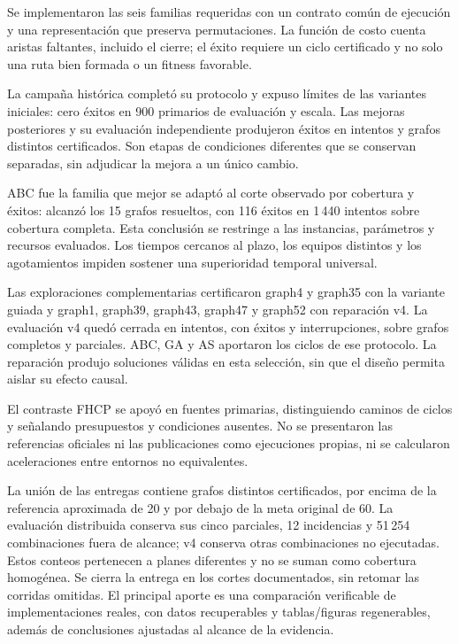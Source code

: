 Se implementaron las seis familias requeridas con un contrato común de ejecución y una representación que preserva permutaciones. La función de costo cuenta aristas faltantes, incluido el cierre; el éxito requiere un ciclo certificado y no solo una ruta bien formada o un fitness favorable.

La campaña histórica completó su protocolo y expuso límites de las variantes iniciales: cero éxitos en 900 primarios de evaluación y escala. Las mejoras posteriores y su evaluación independiente produjeron \TotalSuccesses{} éxitos en \TotalAttempts{} intentos y \SolvedGraphs{} grafos distintos certificados. Son etapas de condiciones diferentes que se conservan separadas, sin adjudicar la mejora a un único cambio.

ABC fue la familia que mejor se adaptó al corte observado por cobertura y éxitos: alcanzó los 15 grafos resueltos, con 116 éxitos en 1\,440 intentos sobre cobertura completa. Esta conclusión se restringe a las instancias, parámetros y recursos evaluados. Los tiempos cercanos al plazo, los equipos distintos y los agotamientos impiden sostener una superioridad temporal universal.

Las exploraciones complementarias certificaron graph4 y graph35 con la variante guiada y graph1, graph39, graph43, graph47 y graph52 con reparación v4. La evaluación v4 quedó cerrada en \RepairAttempts{} intentos, con \RepairSuccesses{} éxitos y \RepairErrors{} interrupciones, sobre \RepairComplete{} grafos completos y \RepairPartial{} parciales. ABC, GA y AS aportaron los ciclos de ese protocolo. La reparación produjo soluciones válidas en esta selección, sin que el diseño permita aislar su efecto causal.

El contraste FHCP se apoyó en fuentes primarias, distinguiendo caminos de ciclos y señalando presupuestos y condiciones ausentes. No se presentaron las referencias oficiales ni las publicaciones como ejecuciones propias, ni se calcularon aceleraciones entre entornos no equivalentes.

La unión de las entregas contiene \UnionCertifiedGraphs{} grafos distintos certificados, por encima de la referencia aproximada de 20 y por debajo de la meta original de 60. La evaluación distribuida conserva sus cinco parciales, 12 incidencias y 51\,254 combinaciones fuera de alcance; v4 conserva otras \RepairOmitted{} combinaciones no ejecutadas. Estos conteos pertenecen a planes diferentes y no se suman como cobertura homogénea. Se cierra la entrega en los cortes documentados, sin retomar las corridas omitidas. El principal aporte es una comparación verificable de implementaciones reales, con datos recuperables y tablas/figuras regenerables, además de conclusiones ajustadas al alcance de la evidencia.
